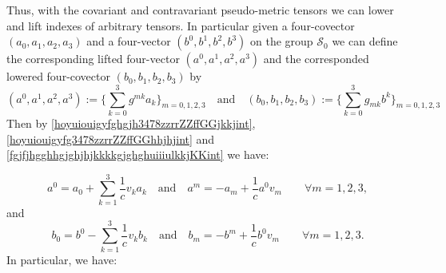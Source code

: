 \documentclass{article}
\theoremstyle{definition}
\theoremstyle{remark}
\renewcommand{\vec}[1]{\mathbf{#1}}
\newcommand{\er}{\eqref}
\newcommand{\er}{\eqref}
\begin{document}
Thus, with the covariant and contravariant pseudo-metric tensors we
can lower and lift indexes of arbitrary tensors. In particular given
a four-covector $(a_0,a_1,a_2,a_3)$ and a four-vector
$(b^0,b^1,b^2,b^3)$ on the group $\mathcal{S}_0$ we can define the
corresponding lifted four-vector $(a^0,a^1,a^2,a^3)$ and the
corresponded lowered four-covector $(b_0,b_1,b_2,b_3)$ by
\begin{equation}\label{fgjfjhgghhgjghjhjkkkkgjghghuiiiulkkjKKint}
(a^0,a^1,a^2,a^3):=\Big\{\sum_{k=0}^{3}g^{mk}a_{k}\Big\}_{m=0,1,2,3}\quad\text{and}\quad
(b_0,b_1,b_2,b_3):=\Big\{\sum_{k=0}^{3}g_{mk}b^{k}\Big\}_{m=0,1,2,3}
\end{equation}
Then by \er{hoyuiouigyfghgjh3478zzrrZZffGGjkkjint},
\er{hoyuiouigyfg3478zzrrZZffGGhhjhjint} and
\er{fgjfjhgghhgjghjhjkkkkgjghghuiiiulkkjKKint} we have:
%
%
%
\begin{comment}
\begin{equation}\label{fgjfjhgghhgjghjhjkkkkgjghghuiiiulkkjKKyuyyuint}
a^0=a_{0}+\sum_{k=1}^{3}\frac{1}{c}v_k a_{k}\quad\text{and}\quad
a^m=-a_{m}+\frac{1}{c}\bigg(a_{0}+\sum_{k=1}^{3}\frac{1}{c}v_k
a_{k}\bigg)v_m\quad\quad\forall m=1,2,3,
\end{equation}
and
\begin{multline}\label{fgjfjhgghhgjghjhjkkkkgjghghuiiiulkkjKKyuyyuuuuiint}
b_0=\left(1-\frac{|\vec
v|^2}{c^2}\right)b^{0}+\sum_{k=1}^{3}\frac{1}{c}v_k
b^{k}=b^0-\sum_{k=1}^{3}\frac{1}{c}v_k\left(-
b^{k}+\frac{1}{c}b^0v_k\right)\\ \quad\text{and}\quad
b_m=-b^{m}+\frac{1}{c} b^{0}v_m\quad\quad\forall m=1,2,3.
\end{multline}
We also can rewrite
\er{fgjfjhgghhgjghjhjkkkkgjghghuiiiulkkjKKyuyyuint} and
\er{fgjfjhgghhgjghjhjkkkkgjghghuiiiulkkjKKyuyyuuuuiint} as:
\end{comment}
%
%
%
\begin{equation}\label{fgjfjhgghhgjghjhjkkkkgjghghuiiiulkkjKKyuyyuiouiint}
a^0=a_{0}+\sum_{k=1}^{3}\frac{1}{c}v_k a_{k}\quad\text{and}\quad
a^m=-a_{m}+\frac{1}{c}a^0v_m\quad\quad\forall m=1,2,3,
\end{equation}
and
\begin{equation}\label{fgjfjhgghhgjghjhjkkkkgjghghuiiiulkkjKKyuyyuuuuiiuiiint}
b_0=b^0-\sum_{k=1}^{3}\frac{1}{c}v_kb_k \quad\text{and}\quad
b_m=-b^{m}+\frac{1}{c} b^{0}v_m\quad\quad\forall m=1,2,3.
\end{equation}
In particular, we have:
%
%
%
\end{document}
